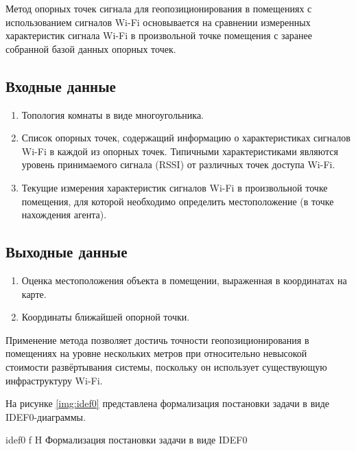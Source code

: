 Метод опорных точек сигнала для геопозиционирования в помещениях с использованием сигналов Wi-Fi основывается на сравнении измеренных характеристик сигнала Wi-Fi в произвольной точке помещения с заранее собранной базой данных опорных точек.

\subsection*{Входные данные}

\begin{enumerate}
    \item Топология комнаты в виде многоугольника.
    \item Список опорных точек, содержащий информацию о характеристиках сигналов Wi-Fi в каждой из опорных точек. Типичными характеристиками являются уровень принимаемого сигнала (RSSI) от различных точек доступа Wi-Fi.
    \item Текущие измерения характеристик сигналов Wi-Fi в произвольной точке помещения, для которой необходимо определить местоположение (в точке нахождения агента).
\end{enumerate}

\subsection*{Выходные данные}

\begin{enumerate}
    \item Оценка местоположения объекта в помещении, выраженная в координатах на карте.
    \item Координаты ближайшей опорной точки.
\end{enumerate}

Применение метода позволяет достичь точности геопозиционирования в помещениях на уровне нескольких метров при относительно невысокой стоимости развёртывания системы, поскольку он использует существующую инфраструктуру Wi-Fi.

\clearpage

На рисунке \ref{img:idef0} представлена формализация постановки задачи в виде IDEF0-диаграммы.

    {idef0}
    {f}
    {H}
    {\linewidth}
    {Формализация постановки задачи в виде IDEF0}
